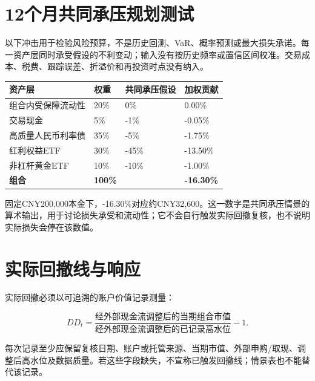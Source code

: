 \section{12个月共同承压规划测试}

以下冲击用于检验风险预算，不是历史回测、VaR、概率预测或最大损失承诺。每一资产层同时承受假设的不利变动；输入没有按历史频率或置信区间校准。交易成本、税费、跟踪误差、折溢价和再投资时点没有纳入。

\begin{exhibitbox}[基准稳健核心的共同承压算术]
\small
\begin{tabularx}{\exhibitboxwidth}{L{3cm}P P P}
\toprule
\textbf{资产层} & \textbf{权重} & \textbf{共同承压假设} & \textbf{加权贡献} \\
\midrule
组合内受保障流动性 & 20\% & 0\% & 0.00\% \\
交易现金 & 5\% & -1\% & -0.05\% \\
高质量人民币利率债 & 35\% & -5\% & -1.75\% \\
红利权益ETF & 30\% & -45\% & -13.50\% \\
非杠杆黄金ETF & 10\% & -10\% & -1.00\% \\
\midrule
\textbf{组合} & \textbf{100\%} &  & \textbf{-16.30\%} \\
\bottomrule
\end{tabularx}
\end{exhibitbox}

固定CNY200,000本金下，-16.30\%对应约CNY32,600。这一数字是共同承压情景的算术输出，用于讨论损失承受和流动性；它不会自行触发实际回撤复核，也不说明实际损失会停在该数值。

\section{实际回撤线与响应}

实际回撤必须以可追溯的账户价值记录测量：

\[
DD_t=\frac{\text{经外部现金流调整后的当期组合市值}}{\text{经外部现金流调整后的已记录高水位}}-1.
\]

每次记录至少应保留复核日期、账户或托管来源、当期市值、外部申购/取现、调整后高水位及数据质量。若这些字段缺失，不宣称已触发回撤线；情景表也不能替代该记录。

